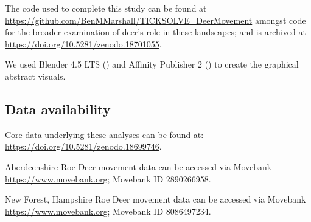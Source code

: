 \documentclass[10pt,a4paper]{article}
\begin{document}
The code used to complete this study can be found at \url{https://github.com/BenMMarshall/TICKSOLVE_DeerMovement} amongst code for the broader examination of deer's role in these landscapes; and is archived at \url{https://doi.org/10.5281/zenodo.18701055}.

We used Blender 4.5 LTS () and Affinity Publisher 2 () to create the graphical abstract visuals.

\subsection{Data availability}\label{data-availability}

Core data underlying these analyses can be found at: \url{https://doi.org/10.5281/zenodo.18699746}.

Aberdeenshire Roe Deer movement data can be accessed via Movebank \url{https://www.movebank.org}; Movebank ID 2890266958.

New Forest, Hampshire Roe Deer movement data can be accessed via Movebank \url{https://www.movebank.org}; Movebank ID 8086497234.
\end{document}
